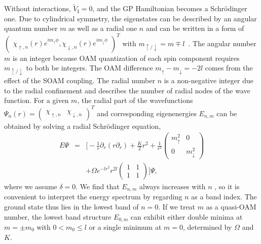 \documentclass[twocolumn,pra,unsortedaddress,showpacs,floatfix,citeautoscript,nofootinbib]{revtex4-1}
\begin{document}
Without interactions, $\tilde V_{\text{I}}=0$, and the GP
Hamiltonian becomes a Schr\"{o}dinger one. Due to cylindrical
symmetry, the eigenstates can be described by an angular quantum
number $m$ as well as a radial one $n$ and can be written in a
form of ${\left( {
\begin{array}{cc}
{{\chi _{\uparrow ,{n}}}(r){e^{i{m_{\uparrow }}\phi }}} , {{\chi
_{\downarrow ,{n}}}(r){e^{i{m_{\downarrow }}\phi }}}
\end{array}
}\right) ^{T}}$ with $m_{\uparrow /\downarrow }=m\mp l$~\cite{Pu}.
The angular number $m$ is an integer because OAM quantization of
each spin component requires $m_{\uparrow /\downarrow }$ to both
be integers. The OAM difference $m_{\uparrow }-m_{\downarrow
}=-2l$ comes from the effect of the SOAM coupling. The radial
number $n$ is a non-negative integer due to the radial confinement
and describes the number of radial nodes of the wave function. For
a given $m$, the radial part of the wavefunctions $\Psi
_{n}(r)={\left( {
\begin{array}{cc}
{{\chi _{\uparrow ,{n}}}} & {{\chi _{\downarrow ,{n}}}}
\end{array}
}\right) ^{T}}$ and corresponding eigenenergies $E_{n,m}$ can be obtained by
solving a radial Schr\"{o}dinger equation,
\begin{eqnarray}
E\Psi  &=&\Big[-\frac{1}{r}{\partial _{r}}\left( {r{\partial _{r}}}\right) +%
\frac{K}{2}{r^{2}}+\frac{1}{{{r^{2}}}}\left( {
\begin{array}{cc}
{m_{\uparrow }^{2}} & 0
\\
0 & {m_{\downarrow }^{2}}
\end{array}
}\right)   \nonumber \\
&&+\Omega {e^{-l{r^{2}}}}{r^{2l}}\left( {
\begin{array}{cc}
1 & 1  \\
1 & 1
\end{array}
}\right) \Big]\Psi ,  \label{eq:non-int_H}
\end{eqnarray}
where we assume $\delta =0$. We find that $E_{n,m}$ always increases with $n$%
, so it is convenient to interpret the energy spectrum by regarding $n$ as a
band index. The ground state thus lies in the lowest band of $n=0$. If we
treat $m$ as a quasi-OAM number, the lowest band structure $E_{0,m}$ can
exhibit either double minima at $m=\pm m_{0}$ with $0<m_{0}\leq l$ or a
single minimum at $m=0$, determined by $\Omega $ and $K$.
\end{document}
